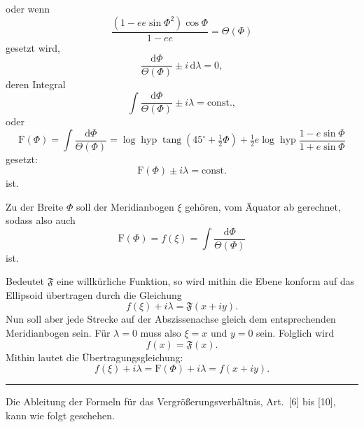 {\small
\noindent oder wenn
\begin{equation*}
\frac{(1-ee\sin\Phi^2)\cos\Phi}{1-ee}=\Theta(\Phi)
\tag*{1)}
\end{equation*}
\noindent gesetzt wird,
\[
\frac{\mathrm d\Phi}{\Theta(\Phi)}\pm i\,\mathrm d\lambda=0,
\]
\noindent deren Integral
\[
\int\frac{\mathrm d\Phi}{\Theta(\Phi)}\pm i\lambda=\mathrm{const.},
\]
\noindent oder
\begin{equation*}
\mathrm F(\Phi)=\int\frac{\mathrm d\Phi}{\Theta(\Phi)}
=\log\operatorname{hyp}\operatorname{tang}(45^\circ+\tfrac12\Phi)
+\tfrac12 e\log\operatorname{hyp}\frac{1-e\sin\Phi}{1+e\sin\Phi}
\tag*{2)}
\end{equation*}
\noindent gesetzt:
\[
\mathrm F(\Phi)\pm i\lambda=\mathrm{const.}
\]
\noindent ist.

Zu der Breite \(\Phi\) soll der Meridianbogen \(\xi\) gehören, vom Äquator ab gerechnet,
sodass also auch
\begin{equation*}
\mathrm F(\Phi)=f(\xi)=\int\frac{\mathrm d\Phi}{\Theta(\Phi)}
\tag*{3)}
\end{equation*}
\noindent ist.

Bedeutet \(\mathfrak F\) eine willkürliche Funktion, so wird mithin die Ebene konform
auf das Ellipsoid übertragen durch die Gleichung
\[
f(\xi)+i\lambda=\mathfrak F(x+iy).
\]
Nun soll aber jede Strecke auf der Abszissenachse gleich dem entsprechenden Meridianbogen
sein. Für \(\lambda=0\) muss also \(\xi=x\) und \(y=0\) sein. Folglich wird
\[
f(x)=\mathfrak F(x).
\]
\noindent Mithin lautet die Übertragungsgleichung:
\begin{equation*}
f(\xi)+i\lambda=\mathrm F(\Phi)+i\lambda=f(x+iy).
\tag*{4)}
\end{equation*}
\begin{center}\rule{.24\linewidth}{.4pt}\end{center}

Die Ableitung der Formeln für das Vergrößerungsverhältnis, Art.\ [6] bis [10],
kann wie folgt geschehen.

}
